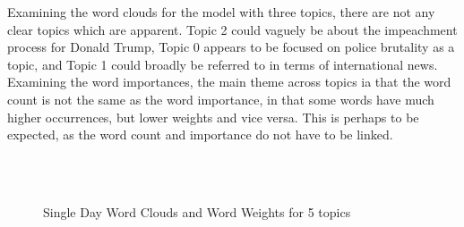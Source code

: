 Examining the word clouds for the model with three topics, there are not any clear topics which are apparent. Topic 2 could vaguely be about the impeachment process for Donald Trump, Topic 0 appears to be focused on police brutality as a topic, and Topic 1 could broadly be referred to in terms of international news. Examining the word importances, the main theme across topics ia that the word count is not the same as the word importance, in that some words have much higher occurrences, but lower weights and vice versa. This is perhaps to be expected, as the word count and importance do not have to be linked.

\begin{figure}[H]
	\centering
	\\
	\\
	
	\caption{Single Day Word Clouds and Word Weights for 5 topics}
	\label{fig:single5}
\end{figure}	

